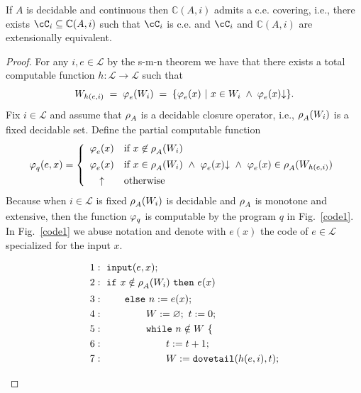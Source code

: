 \documentclass[runningheads]{llncs}
\def\ok#1{\mbox{\raisebox{0ex}[1ex][1ex]{$#1$}}}
\def\re{c.e.}
\def\bbbc{{\mathbb{C}}}
\def\dovetl{{\tt dovetail}}
\newcommand{\ccL}{\mathscr{L}}
\newcommand{\pfunction}[3]{\ok{\varphi^{#2\, #3}_{#1}}}
\newcommand{\auco}[2]{\ok{\rho^{#1}_{#2}}}
\newcommand{\ra}{\rightarrow}
\def\ok#1{\mbox{\raisebox{0ex}[1ex][1ex]{$#1$}}}
\def\cAA{\ensuremath{A}}
\newcommand{\sset}[2]{\{#1  ~|~ #2\}}
\begin{document}
\begin{theorem}\label{covering}
    If $\cAA$ is decidable and continuous then $\bbbc(\cAA,i)$ admits a {\re} covering, i.e., there exists $\cC_i\subseteq \bbbc(\cAA,i)$ such that $\cC_i$ is {\re} and $\cC_i$ and $\bbbc(\cAA,i)$ are extensionally equivalent.
\end{theorem}

\begin{proof}
    For any $i,e\in\ccL$ by the s-m-n theorem we have that there exists a total computable function $h:\ccL\ra\ccL$ such that
    \[
     W_{h(e,i)} \;=\; \pfunction{e}{}{}(W_{i})
        \;=\; \sset{\pfunction{e}{}{}(x)}{x \in W_{i} \;\land\; \pfunction{e}{}{}(x){\downarrow}}.
    \] 
    Fix $i\in\ccL$ and assume that $\auco{}{A}$ is a decidable closure operator, i.e., 
    $\auco{}{\cAA}(W_i)$ is a fixed decidable set. Define the partial computable function
    \begin{equation}\label{covering-function}
    \pfunction{q}{}{}(e,x)=\left\{
    \begin{array}{cl}
       \pfunction{e}{}{}(x) &\mbox{if $x\not\in \auco{}{A}(W_{i})$}\\[1ex]
       \pfunction{e}{}{}(x) &\mbox{if $x\in \auco{}{A}(W_{i})~\wedge~\pfunction{e}{}{}(x){\downarrow}~\wedge~\pfunction{e}{}{}(x)\in \auco{}{A}(W_{h(e,i)})$}\\[1ex]
       \uparrow & \mbox{otherwise}
    \end{array}\right .
    \end{equation}
    Because when $i\in\ccL$ is fixed $\auco{}{A}(W_{i})$ is decidable and $\auco{}{A}$ is monotone and extensive, then the function $\pfunction{q}{}{}$ is computable by the program $q$ in Fig.~\ref{code1}. In Fig.~\ref{code1} we abuse notation and denote with $e(x)$ the code of $e\in\ccL$ specialized for the input $x$.
    \begin{figure}[t]
    \begin{align*}
    &1:~{\tt input}(e,x);\\
    &2:~{\tt if}\ x \notin \auco{}{A}(W_i)\ {\tt then}\ e(x)\\
    &3:~\qquad\! {\tt else}\ n := e(x);\\
    &4:~\qquad\qquad W := \varnothing;\ t := 0;\\
    &5:~\qquad\qquad {\tt while}\ n \notin W\ \{\\
    &6:~\qquad\qquad\qquad t := t + 1;\\
    &7:~\qquad\qquad\qquad W := \dovetl(h(e,i),t);\\

\end{align*}
\end{figure}
\end{proof}
\end{document}
